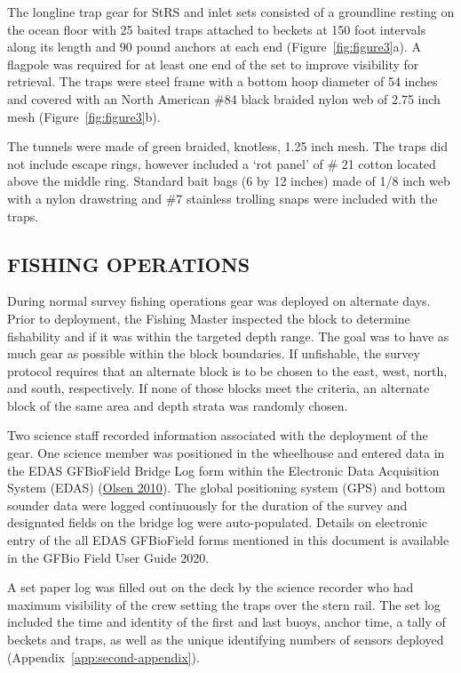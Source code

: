 \documentclass[12pt]{article}\usepackage[]{graphicx}\usepackage[]{color}
\begin{document}
The longline trap gear for StRS and inlet sets consisted of a groundline resting on the ocean floor with 25 baited traps attached to beckets at 150 foot intervals along its length and 90 pound anchors at each end (Figure~\ref{fig:figure3}a). A flagpole was required for at least one end of the set to improve visibility for retrieval. The traps were steel frame with a bottom hoop diameter of 54 inches and covered with an North American \#84 black braided nylon web of 2.75 inch mesh (Figure~\ref{fig:figure3}b).

The tunnels were made of green braided, knotless, 1.25 inch mesh. The traps did not include escape rings, however included a `rot panel' of \# 21 cotton located above the middle ring. Standard bait bags (6 by 12 inches) made of 1/8 inch web with a nylon drawstring and \#7 stainless trolling snaps were included with the traps.

\hypertarget{fishing-operations}{%
\subsection{FISHING OPERATIONS}\label{fishing-operations}}

During normal survey fishing operations gear was deployed on alternate days. Prior to deployment, the Fishing Master inspected the block to determine fishability and if it was within the targeted depth range. The goal was to have as much gear as possible within the block boundaries. If unfishable, the survey protocol requires that an alternate block is to be chosen to the east, west, north, and south, respectively. If none of those blocks meet the criteria, an alternate block of the same area and depth strata was randomly chosen.

Two science staff recorded information associated with the deployment of the gear. One science member was positioned in the wheelhouse and entered data in the EDAS GFBioField Bridge Log form within the Electronic Data Acquisition System (EDAS) (\protect\hyperlink{ref-Olsen2010}{Olsen 2010}). The global positioning system (GPS) and bottom sounder data were logged continuously for the duration of the survey and designated fields on the bridge log were auto-populated. Details on electronic entry of the all EDAS GFBioField forms mentioned in this document is available in the GFBio Field User Guide 2020.

A set paper log was filled out on the deck by the science recorder who had maximum visibility of the crew setting the traps over the stern rail. The set log included the time and identity of the first and last buoys, anchor time, a tally of beckets and traps, as well as the unique identifying numbers of sensors deployed (Appendix~\ref{app:second-appendix}).
\end{document}
